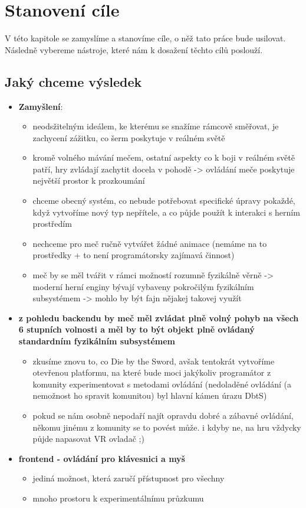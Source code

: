 \chapter{Stanovení cíle}

V této kapitole se zamyslíme a stanovíme cíle, o něž tato práce bude usilovat. Následně vybereme nástroje, které nám k dosažení těchto cílů poslouží.  


\section{Jaký chceme výsledek}
\begin{itemize}
    \item \textbf{Zamyšlení}:
        \begin{itemize}
            \item neodsžitelným ideálem, ke kterému se snažíme rámcově směřovat, je zachycení zážitku, co šerm poskytuje v reálném světě
            \item kromě volného mávání mečem, ostatní aspekty co k boji v reálném světě patří, hry zvládají zachytit docela v pohodě -> ovládání meče poskytuje největší prostor k prozkoumání
            \item chceme obecný systém, co nebude potřebovat specifické úpravy pokaždé, když vytvoříme nový typ nepřítele, a co půjde použít k interakci s herním prostředím
            \item nechceme pro meč ručně vytvářet žádné animace (nemáme na to prostředky + to není programátorsky zajímavá činnost)
            \item meč by se měl tvářit v rámci možností rozumně fyzikálně věrně -> moderní herní enginy bývají vybaveny pokročilým fyzikálním subsystémem -> mohlo by být fajn nějakej takovej využít
        \end{itemize}
    
    \item \textbf{z pohledu backendu by meč měl zvládat plně volný pohyb na všech 6 stupních volnosti a měl by to být objekt plně ovládaný standardním fyzikálním subsystémem}
        \begin{itemize}
            \item zkusíme znovu to, co Die by the Sword, avšak tentokrát vytvoříme otevřenou platformu, na které bude moci jakýkoliv programátor z komunity experimentovat s metodami ovládání (nedoladěné ovládání (a nemožnost ho spravit komunitou) byl hlavní kámen úrazu DbtS)
            \item pokud se nám osobně nepodaří najít opravdu dobré a zábavné ovládání, někomu jinému z komunity se to povést může. i kdyby ne, na hru vždycky půjde napasovat VR ovladač ;)
        \end{itemize}
    \item \textbf{frontend - ovládání pro klávesnici a myš}
        \begin{itemize}
            \item jediná možnost, která zaručí přístupnost pro všechny
            \item mnoho prostoru k experimentálnímu průzkumu
        \end{itemize}
\end{itemize}

